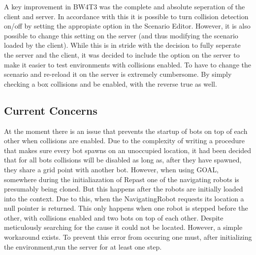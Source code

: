 \documentclass{article}
\begin{document}
A key improvement in BW4T3 was the complete and absolute seperation of the client and server. In accordance with this it is possible to turn collision detection on/off  by setting the appropiate option in the Scenario Editor. However, it is also possible to change this setting on the server (and thus modifying the scenario loaded by the client). While this is in stride with the decision to fully seperate the server and the client, it was decided to include the option on the server to make it easier to test environments with collisions enabled. To have to change the scenario and re-reload it on the server is extremely cumbersome. By simply checking a box collisions and be enabled, with the reverse true as well. 

\subsection*{Current Concerns}

At the moment there is an issue that prevents the startup of bots on top of each other when collisions are enabled. Due to the complexity of writing a procedure that makes sure every bot spawns on an unoccupied location, it had been decided that for all bots collisions will be disabled as long as, after they have spawned, they share a grid point with another bot. 
However, when using GOAL, somewhere during the initialiazation of Repast one of the navigating robots is presumably being cloned. But this happens after the robots are initially loaded into the context. Due to this, when the NavigatingRobot requests its location a null pointer is returned. This only happens when one robot is stepped before the other, with collisions enabled and two bots on top of each other. Despite meticulously searching for the cause it could not be located. However, a simple workaround exists. To prevent this error from occuring one must, after initializing the environment,run the server for at least one step.
\end{document}
